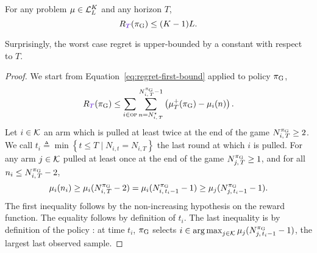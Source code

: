\begin{proposition}
\label{prop:GB-ub}
For any problem $\mu \in \mathcal{L}_L^K$ and any horizon $T$, 
\[\regret (\GB) \leq (K-1)L. \]
\end{proposition}
Surprisingly, the worst case regret is upper-bounded by a constant with respect to $T$. %
\begin{proof}
We start from Equation~\ref{eq:regret-first-bound} applied to policy $\pi_{\rm G}$,
\begin{equation}
\label{eq:regret-first-bound-GB}
\regret(\GB) \leq \sum_{i\in \overpullSet}   \sum_{n=\NiT^\star}^{\NiT^{\GB}-1} \pa{\mu^+_T(\GB) - \mu_i(n)}.
\end{equation}
%
Let $i \in \mathcal{K}$ an arm which is pulled at least twice at the end of the game $N_{i,\,T}^{\pi_{\rm G}} \geq 2$. We call $t_i \triangleq \min\left\{t\leq T\; |\; N_{i,t} = N_{i,T}\right\}$ the last round at which $i$ is pulled. For any arm  $j \in \mathcal{K}$ pulled at least once at the end of the game $N_{j,\,T}^{\pi_{\rm G}} \geq 1$, and for all $n_i \leq N_{i,\,T}^{\pi_{\rm G}} -2$, 
\begin{equation}
\label{eq:overpull-GB1}
\mu_i(n_i) \geq \mu_i(N_{i,\,T}^{\pi_{\rm G}} - 2 ) = \mu_i(N_{i,\,t_i -1}^{\pi_{\rm G}} - 1 ) \geq \mu_j(N_{j,\,t_i-1}^{\pi_{\rm G}} - 1).
\end{equation}
The first inequality follows by the non-increasing hypothesis on the reward function. The equality follows by definition of $t_i$. The last inequality is by definition of the policy : at time $t_i$, $\pi_{\rm G}$ selects $i \in \operatorname*{arg\,max}_{j \in \mathcal{K}} \mu_j(N_{j,\,t_i-1}^{\pi_{\rm G}}-1)$, the largest last observed sample. 


\end{proof}
